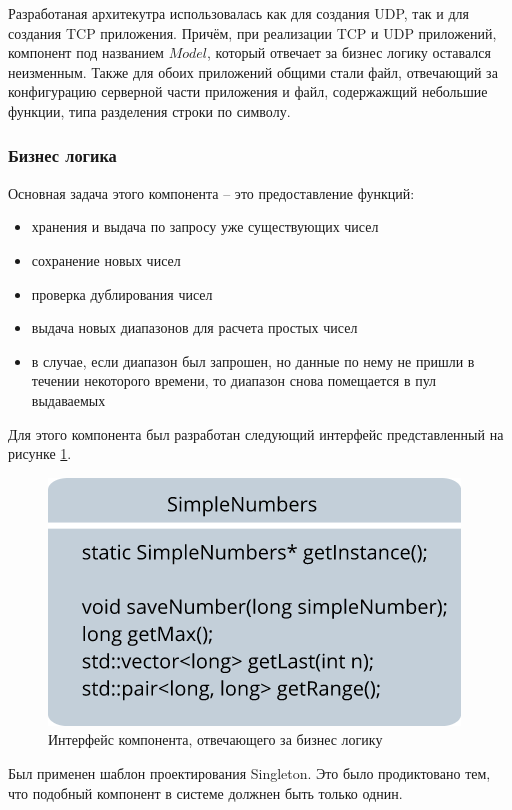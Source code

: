 \documentclass[a4paper,14pt]{extarticle}
\begin{document}
Разработаная архитекутра использовалась как для создания UDP, так и для создания TCP приложения.
Причём, при реализации TCP и UDP приложений, компонент под названием $Model$, который отвечает за бизнес логику оставался неизменным.
Также для обоих приложений общими стали файл, отвечающий за конфигурацию серверной части приложения и файл, содержажщий небольшие функции, типа разделения строки по символу.

\subsubsection{Бизнес логика}
Основная задача этого компонента -- это предоставление функций:
\begin{itemize}
\item хранения и выдача по запросу уже существующих чисел
\item сохранение новых чисел
\item проверка дублирования чисел
\item выдача новых диапазонов для расчета простых чисел
\item в случае, если диапазон был запрошен, но данные по нему не пришли в течении некоторого времени, то диапазон снова помещается в пул выдаваемых
\end{itemize}

Для этого компонента был разработан следующий интерфейс представленный на рисунке \ref{SimpleNumbers}.
\begin{figure}[H]
	\begin{center}
		\includegraphics[scale=0.5]{pics/SimpleNumbers}
		\caption{Интерфейс компонента, отвечающего за бизнес логику}
		\label{SimpleNumbers}
	\end{center}
\end{figure}

Был применен шаблон проектирования Singleton. Это было продиктовано тем, что подобный компонент в системе должнен быть только однин.
\end{document}
